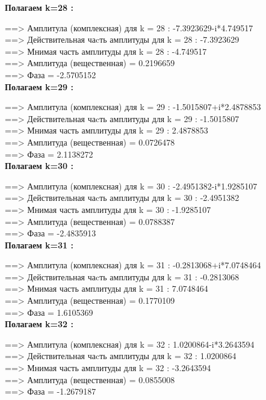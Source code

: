 \documentclass[a4paper,11pt]{article}
\begin{document}
\begin{flushleft}
\textbf{Полагаем k=28 :\\} 

 ==> Амплитула (комплексная) для k = 28 : -7.3923629-i*4.749517\\ 
 ==> Действительная чаcть амплитуды  для k = 28 : -7.3923629\\ 
 ==> Мнимая часть амплитуды  для k = 28 : -4.749517\\ 
 ==> Амплитуда (вещественная) = 0.2196659\\ 
 ==> Фаза = -2.5705152\\ 

\textbf{Полагаем k=29 :\\} 

 ==> Амплитула (комплексная) для k = 29 : -1.5015807+i*2.4878853\\ 
 ==> Действительная чаcть амплитуды  для k = 29 : -1.5015807\\ 
 ==> Мнимая часть амплитуды  для k = 29 : 2.4878853\\ 
 ==> Амплитуда (вещественная) = 0.0726478\\ 
 ==> Фаза = 2.1138272\\ 
\textbf{Полагаем k=30 :\\} 

 ==> Амплитула (комплексная) для k = 30 : -2.4951382-i*1.9285107\\ 
 ==> Действительная чаcть амплитуды  для k = 30 : -2.4951382\\ 
 ==> Мнимая часть амплитуды  для k = 30 : -1.9285107\\ 
 ==> Амплитуда (вещественная) = 0.0788387\\ 
 ==> Фаза = -2.4835913\\ 

\textbf{Полагаем k=31 :\\} 

 ==> Амплитула (комплексная) для k = 31 : -0.2813068+i*7.0748464\\ 
 ==> Действительная чаcть амплитуды  для k = 31 : -0.2813068\\ 
 ==> Мнимая часть амплитуды  для k = 31 : 7.0748464\\ 
 ==> Амплитуда (вещественная) = 0.1770109\\ 
 ==> Фаза = 1.6105369\\ 

\textbf{Полагаем k=32 :\\} 

 ==> Амплитула (комплексная) для k = 32 :  1.0200864-i*3.2643594\\ 
 ==> Действительная чаcть амплитуды  для k = 32 : 1.0200864\\ 
 ==> Мнимая часть амплитуды  для k = 32 : -3.2643594\\ 
 ==> Амплитуда (вещественная) = 0.0855008\\ 
 ==> Фаза = -1.2679187\\ 


\end{flushleft}
\end{document}
